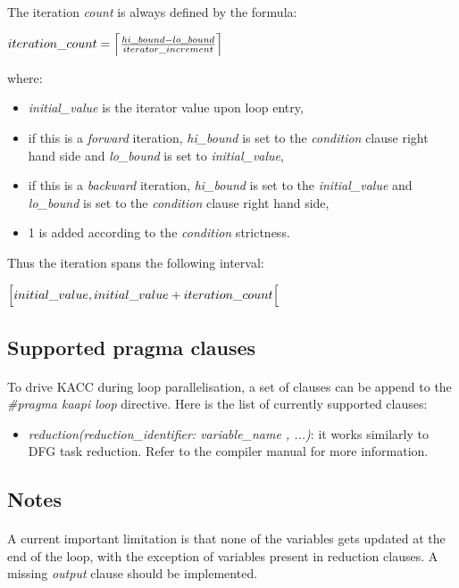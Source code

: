 \documentclass[a4paper, 11pt]{article}
\begin{document}
\paragraph{}
The iteration \textit{count} is always defined by the formula:
\begin{center}
  $iteration\_count = \Bigl\lceil \frac{hi\_bound - lo\_bound}{iterator\_increment} \Bigr\rceil$
\end{center}
where:
\begin{itemize}
\item \textit{initial\_value} is the iterator value upon loop entry,
\item if this is a \textit{forward} iteration, \textit{hi\_bound} is set to the \textit{condition}
clause right hand side and \textit{lo\_bound} is set to \textit{initial\_value},
\item if this is a \textit{backward} iteration, \textit{hi\_bound} is set to the \textit{initial\_value}
and \textit{lo\_bound} is set to the \textit{condition} clause right hand side,
\item 1 is added according to the \textit{condition} strictness.
\end{itemize}
Thus the iteration spans the following interval:
\begin{center}
  $\Bigl[ initial\_value, initial\_value + iteration\_count \Bigr[$
\end{center}

\subsection{Supported pragma clauses}
\paragraph{}
To drive KACC during loop parallelisation, a set of clauses can be append to the
\textit{\#pragma kaapi loop} directive. Here is the list of currently supported clauses:
\begin{itemize}
  \item \textit{reduction(reduction\_identifier: variable\_name , ...)}: it works similarly
    to DFG task reduction. Refer to the compiler manual for more information.
\end{itemize}

\subsection{Notes}
\paragraph{}
A current important limitation is that none of the variables gets updated at the end
of the loop, with the exception of variables present in reduction clauses. A missing
\textit{output} clause should be implemented.
\end{document}
